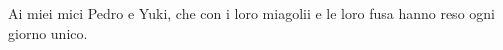 \thispagestyle{empty}
\vspace*{3cm}
Ai miei mici Pedro e Yuki, che con i loro miagolii e le loro fusa hanno reso ogni giorno unico.